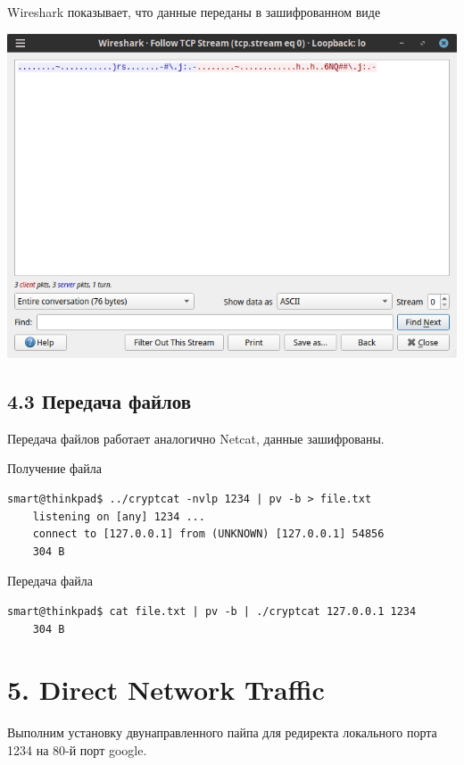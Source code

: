 Wireshark показывает, что данные переданы в зашифрованном виде
\begin{center}
    \includegraphics[scale=0.55]{res/7.wireshark-cryptcat-follow.png}
\end{center}

\subsection*{4.3 Передача файлов}

Передача файлов работает аналогично Netcat, данные зашифрованы.

Получение файла
\begin{Verbatim}[frame=single]
    smart@thinkpad$ ../cryptcat -nvlp 1234 | pv -b > file.txt
    listening on [any] 1234 ...
    connect to [127.0.0.1] from (UNKNOWN) [127.0.0.1] 54856
    304 B
\end{Verbatim}

Передача файла
\begin{Verbatim}[frame=single]
    smart@thinkpad$ cat file.txt | pv -b | ./cryptcat 127.0.0.1 1234
    304 B
\end{Verbatim}

\section*{5. Direct Network Traffic}

Выполним установку двунаправленного пайпа для редиректа локального порта 1234 на 80-й порт google.

